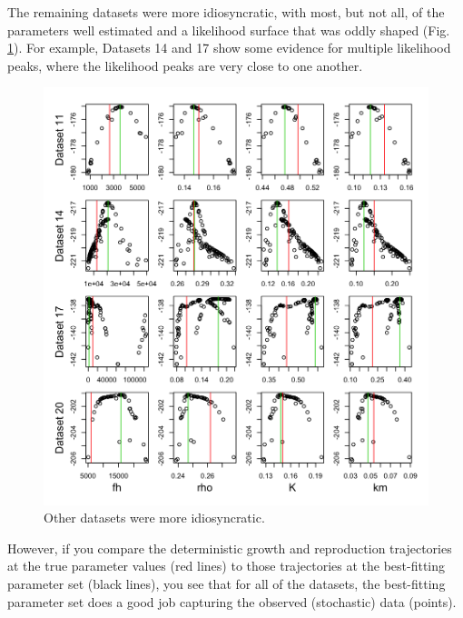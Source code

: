 \documentclass[12pt,reqno,final,pdftex]{amsart}\usepackage[]{graphicx}\usepackage[]{color}
\newenvironment{knitrout}{}{} %
\theoremstyle{plain}
\numberwithin{equation}{part}
\begin{document}
The remaining datasets were more idiosyncratic, with most, but not all, of the parameters well estimated and a likelihood surface that was oddly shaped (Fig. \ref{fig:lik-against-ests-6}).
For example, Datasets 14 and 17 show some evidence for multiple likelihood peaks, where the likelihood peaks are very close to one another.

\begin{knitrout}\scriptsize
{}\color{fgcolor}\begin{figure}

\includegraphics[width=\linewidth]{figure/lik-against-ests-6-1} \hfill{}

\caption[Other datasets were more idiosyncratic]{Other datasets were more idiosyncratic.}\label{fig:lik-against-ests-6}
\end{figure}


\end{knitrout}

\clearpage

However, if you compare the deterministic growth and reproduction trajectories at the true parameter values (red lines) to those trajectories at the best-fitting parameter set (black lines), you see that for all of the datasets, the best-fitting parameter set does a good job capturing the observed (stochastic) data (points).
\end{document}
